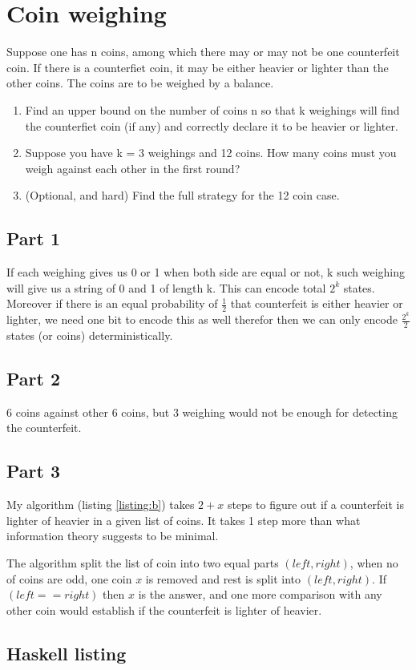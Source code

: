 \documentclass[a4paper,10pt]{article}
\begin{document}
\section{Coin weighing}

Suppose one has n coins, among which there may or may not be one counterfeit
coin. If there is a counterfiet coin, it may be either heavier or lighter than
the other coins. The coins are to be weighed by a balance.

\begin{enumerate}
    \item Find an upper bound on the number of coins n so that k weighings will find the
counterfiet coin (if any) and correctly declare it to be heavier or lighter.
    \item Suppose you have k = 3 weighings and 12 coins. How many coins must you weigh
against each other in the first round?
    \item (Optional, and hard) Find the full strategy for the 12 coin case.
\end{enumerate}

\subsection{Part 1}

If each weighing gives us 0 or 1 when both side are equal or not, k such
weighing will give us a string of 0 and 1 of length k. This can encode total
$2^k$ states. Moreover if there is an equal probability of $\frac{1}{2}$ that
counterfeit is either heavier or lighter, we need one bit to encode this as well
therefor then we can only encode $\frac{2^k}{2}$ states (or coins)
deterministically.

\subsection{Part 2}
6 coins against other 6 coins, but 3 weighing would not be enough for detecting
the counterfeit.

\subsection{Part 3}

My algorithm (listing \ref{listing:b}) takes $2+x$ steps to figure out if a
counterfeit is lighter of heavier in a given list of coins. It takes 1 step more
than what information theory suggests to be minimal.

The algorithm split the list of coin into two equal parts $(left, right)$, when
no of coins are odd, one coin $x$ is removed and rest is split into $(left,
right)$. If $(left == right)$ then $x$ is the answer, and one more comparison
with any other coin would establish if the counterfeit is lighter of heavier.

\begin{appendices}
    \section{Haskell listing}
    \label{listing:a}
    
\end{appendices}
\end{document}
